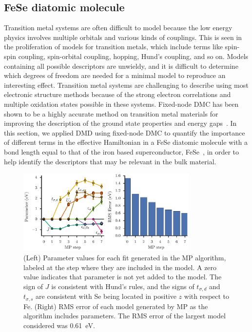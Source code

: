 \subsection{FeSe diatomic molecule}
\label{subsection:fese}
Transition metal systems are often difficult to model because the low energy physics involves multiple orbitals and various kinds of 
couplings. This is seen in the proliferation of models for transition metals, which include terms like spin-spin coupling, spin-orbital coupling, hopping, Hund's coupling, and so on. 
Models containing all possible descriptors are unwieldy, and it is difficult to determine which degrees of freedom are needed for a minimal model to reproduce an interesting effect. 
Transition metal systems are challenging to describe using most electronic structure methods because of the strong electron correlations and multiple oxidation states possible in these systems. 
Fixed-node DMC has been shown to be a highly accurate method on transition metal materials for improving the description of the ground state properties and energy gaps~\cite{Foyevtsova2014, Wagner_Abbamonte, Zheng2015, Wagner2016}. In this section, we applied DMD using fixed-node DMC to quantify the importance of different terms in the effective Hamiltonian in a FeSe diatomic molecule with a bond length equal to that of the iron based superconductor, FeSe~\cite{kumar_crystal_2010}, in order to help identify the descriptors that may be relevant in the bulk material.
\begin{figure}[htb]
  \centering
  \includegraphics[width=0.8\textwidth]{./Figures/fese.eps}
  \caption{
    \label{fig:fese} 
    (Left) Parameter values for each fit generated in the MP algorithm, labeled at the step where they are included in the model. 
    A zero value indicates that parameter is not yet added to the model.
    The sign of $J$ is consistent with Hund's rules, and the signs of $t_{\sigma,d}$ and $t_{\sigma,s}$ are consistent with Se being located in positive $z$ with respect to Fe. 
    (Right) RMS error of each model generated by MP as the algorithm includes parameters. 
    The RMS error of the largest model considered was 0.61~eV.
  }
\end{figure}
